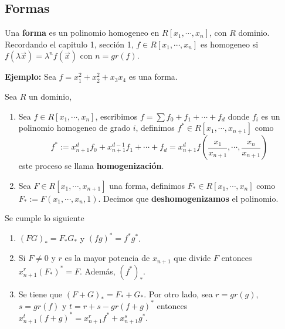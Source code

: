 \documentclass{article}
\begin{document}
\subsection{Formas}
\begin{dfn}
    Una \textbf{forma} es un polinomio homogeneo en $R[x_{1},\cdots,x_{n}]$, con $R$ dominio. 
    Recordando el capitulo 1, sección 1, $f\in R[x_{1},\cdots,x_{n}]$ es homogeneo si 
    $f(\lambda\overrightarrow{x})=\lambda^{n}f(\overrightarrow{x})$ con $n=gr(f)$.
\end{dfn}
\noindent\textbf{Ejemplo:} Sea $f=x_{1}^{2}+x_{2}^{2}+x_{3}x_{4}$ es una forma.
\begin{dfn}
    Sea $R$ un dominio,
    \begin{enumerate}
        \item Sea $f\in R[x_{1},\cdots,x_{n}]$, escribimos $f=\sum f_{0}+f_{1}+\cdots+f_{d}$ donde
        $f_{i}$ es un polinomio homogeneo de grado $i$, definimos $f^{*}\in 
        R[x_{1},\cdots,x_{n+1}]$ como
        \begin{equation*}
            f^{*}:=x^{d}_{n+1}f_{0}+x^{d-1}_{n+1}f_{1}+\cdots+f_{d}=
            x^{d}_{n+1}f\left(\frac{x_{1}}{x_{n+1}},\cdots,\frac{x_{n}}{x_{n+1}}\right)
        \end{equation*}
        este proceso se llama \textbf{homogenización}.

        \item Sea $F\in R[x_{1},\cdots,x_{n+1}]$ una forma, definimos $F_{*}\in 
        R[x_{1},\cdots,x_{n}]$ como $F_{*}:=F(x_{1},\cdots,x_{n},1)$. Decimos que 
        \textbf{deshomogenizamos} el polinomio.
    \end{enumerate}
\end{dfn}
\begin{prop}
    Se cumple lo siguiente
    \begin{enumerate}
        \item $(FG)_{*}=F_{*}G_{*}$ y $(fg)^{*}=f^{*}g^{*}$.
        
        \item Si $F\neq0$ y $r$ es la mayor potencia de $x_{n+1}$ que divide $F$ entonces 
        $x^{r}_{n+1}(F_{*})^{*}=F$. Además, $(f^{*})_{*}$.
        
        \item Se tiene que $(F+G)_{*}=F_{*}+G_{*}$. Por otro lado, sea $r=gr(g)$, $s=gr(f)$ y 
        $t=r+s-gr(f+g)^{*}$ entonces $x^{t}_{n+1}(f+g)^{*}=x^{r}_{n+1}f^{*}+x^{s}_{n+1}g^{*}$.
    \end{enumerate}
\end{prop}
\end{document}
